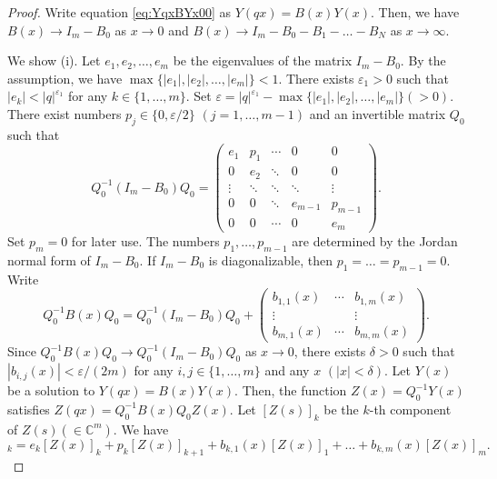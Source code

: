 \documentclass[pdftex]{sigma}
\numberwithin{equation}{section}
\theoremstyle{definition}
\begin{document}
\begin{proof}
Write equation \eqref{eq:YqxBYx00} as
$
Y(q x) = B(x) Y(x) $.
Then, we have $B(x) \to I_m -B_0$ as $x \to 0$ and $B(x) \to I_m -B_0 -B_1 - \dots - B_N$ as $x \to \infty$.

We show (i).
Let $e_1, e_2, \dots ,e_m$ be the eigenvalues of the matrix $I_m- B_0 $.
By the assumption, we have $\max \{ |e_1|, |e_2|, \dots , |e_m| \} <1 $.
There exists $\varepsilon _1 >0$ such that $|e_k | <|q|^{\varepsilon _1} $ for any $k \in \{1, \dots ,m \}$.
Set $ \varepsilon = |q|^{\varepsilon _1} - \max \{ |e_1|, |e_2|, \dots , |e_m| \} (>0)$.
There exist numbers $p_j \in \{ 0, \varepsilon /2 \}$ $(j=1, \dots , m-1)$ and an invertible matrix $Q_0$ such that
\begin{equation*}
 Q_0^{-1} ( I_m -B_0 ) Q_0 =
\begin{pmatrix}
e_1 & p_1 & \cdots & 0 & 0 \\
0 & e_2 & \ddots & 0 & 0 \\
\vdots & \ddots & \ddots & \ddots & \vdots \\
0 & 0 & \ddots & e_{m-1} & p_{m-1} \\
0 & 0 & \cdots & 0 & e_{m}
\end{pmatrix}.
\end{equation*}
Set $p_m=0$ for later use.
The numbers $p_1, \dots ,p_{m-1}$ are determined by the Jordan normal form of $ I_m -B_0 $.
If $I_m- B_0 $ is diagonalizable, then $p_1 = \dots = p_{m-1} =0$.
Write
\begin{equation} \label{eq:Q0-BxQ0}
 Q_0^{-1} B(x) Q_0 = Q_0^{-1} ( I_m -B_0 ) Q_0 + \begin{pmatrix}
b_{1,1} (x) & \cdots & b_{1,m} (x) \\
\vdots & & \vdots \\
 b_{m,1} (x) & \cdots & b_{m,m} (x)
\end{pmatrix}.
\end{equation}
Since $Q_0^{-1} B(x) Q_0 \to Q_0^{-1} ( I_m -B_0 ) Q_0 $ as $x \to 0$, there exists $\delta >0$ such that $|b_{i,j}(x)| < \varepsilon /(2m)$ for any $i,j \in \{1, \dots ,m \}$ and any $x$ $(|x| < \delta )$.
Let $Y (x)$ be a solution to $Y (qx) = B(x)Y (x)$.
Then, the function $Z(x) = Q_0^{-1} Y (x)$ satisfies $Z(qx) = Q_0^{-1} B(x) Q_0 Z(x)$.
Let $[Z(s )]_k $ be the $k$-th component of $Z(s ) (\in \mathbb{C} ^{m} )$.
We have
\begin{equation*}
[Z(qx )]_k = e_k [Z(x )]_k + p_k [Z(x )]_{k+1} + b_{k,1}(x) [Z(x )]_1 + \dots + b_{k,m}(x) [Z(x )]_m.
\end{equation*}

\end{proof}
\end{document}
